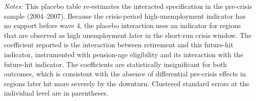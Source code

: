 \documentclass[arguments, manuscript, 11pt]{aastex631}
\begin{document}
\newpage
\begin{table}[h]
\centering
\caption{Falsification test: placebo interacted-IV estimates in the pre-crisis sample}
\label{tabB4}
\tiny{{\singlespacing \emph{Notes:} This placebo table re-estimates the interacted specification in the pre-crisis sample (2004--2007). Because the crisis-period high-unemployment indicator has no support before wave 4, the placebo interaction uses an indicator for regions that are observed as high unemployment later in the short-run crisis window. The coefficient reported is the interaction between retirement and this future-hit indicator, instrumented with pension-age eligibility and its interaction with the future-hit indicator. The coefficients are statistically insignificant for both outcomes, which is consistent with the absence of differential pre-crisis effects in regions later hit more severely by the downturn. Clustered standard errors at the individual level are in parentheses.}}
\end{table}
\end{document}
